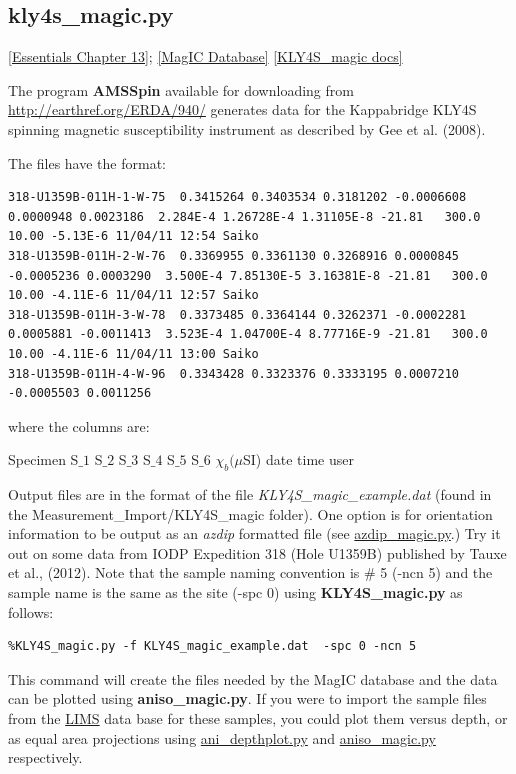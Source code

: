 \documentclass[11pt]{book}
\begin{document}
{{{{%


\subsection{kly4s\_magic.py}  \href{http://earthref.org/MAGIC/books/Tauxe/Essentials/WebBook3ch13.html#ch13}{[Essentials Chapter 13]};
\href{#MagICDatabase}{[MagIC Database]}
\href{https://github.com/PmagPy/PmagPy/blob/master/programs/KLY4S_magic.py}{[KLY4S\_magic docs]}

The program {\bf AMSSpin} available for downloading from \url{http://earthref.org/ERDA/940/}  generates data for the Kappabridge KLY4S spinning magnetic susceptibility instrument as described by Gee et al. (2008).  \nocite{gee08}

The files have the format:
\begin{verbatim}
318-U1359B-011H-1-W-75  0.3415264 0.3403534 0.3181202 -0.0006608 0.0000948 0.0023186  2.284E-4 1.26728E-4 1.31105E-8 -21.81   300.0   10.00 -5.13E-6 11/04/11 12:54 Saiko
318-U1359B-011H-2-W-76  0.3369955 0.3361130 0.3268916 0.0000845 -0.0005236 0.0003290  3.500E-4 7.85130E-5 3.16381E-8 -21.81   300.0   10.00 -4.11E-6 11/04/11 12:57 Saiko
318-U1359B-011H-3-W-78  0.3373485 0.3364144 0.3262371 -0.0002281 0.0005881 -0.0011413  3.523E-4 1.04700E-4 8.77716E-9 -21.81   300.0   10.00 -4.11E-6 11/04/11 13:00 Saiko
318-U1359B-011H-4-W-96  0.3343428 0.3323376 0.3333195 0.0007210 -0.0005503 0.0011256
 \end{verbatim}
 where the columns are:

 Specimen S$\_1$  S$\_2$ S$\_3$  S$\_4$ S$\_5$ S$\_6$ $\chi_b (\mu$SI) date time user


Output files are in the format of the file {\it KLY4S\_magic\_example.dat} (found in the Measurement\_Import/KLY4S\_magic folder).  One option is for orientation information to be output as an {\it azdip} formatted file (see \href{#azdip_magic.py}{azdip\_magic.py}.)
Try it out on some data from IODP Expedition 318 (Hole U1359B) published by Tauxe et al., (2012).  Note that the sample naming convention is \# 5 (-ncn 5)  and the sample name is the same as the site (-spc 0) \nocite{tauxe12} using  {\bf KLY4S\_magic.py} as follows:

\begin{verbatim}
%KLY4S_magic.py -f KLY4S_magic_example.dat  -spc 0 -ncn 5
\end{verbatim}

This command will create the files needed by the MagIC database and the data can be plotted using {\bf aniso\_magic.py}.    If you were to import the sample files from the \href{#LIMS}{LIMS} data base for these samples, you could plot them versus depth, or as equal area projections using \href{#ani_depthplot.py}{ani\_depthplot.py} and \href{#aniso_magic.py}{aniso\_magic.py} respectively.





}}}}
\end{document}
